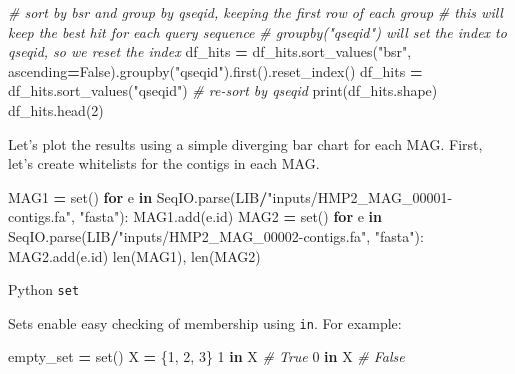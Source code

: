 \documentclass[
]{book}
\newenvironment{Shaded}{\begin{snugshade}}{\end{snugshade}}
\newcommand{\BuiltInTok}[1]{#1}
\newcommand{\CommentTok}[1]{\textcolor[rgb]{0.56,0.35,0.01}{\textit{#1}}}
\newcommand{\ControlFlowTok}[1]{\textcolor[rgb]{0.13,0.29,0.53}{\textbf{#1}}}
\newcommand{\DecValTok}[1]{\textcolor[rgb]{0.00,0.00,0.81}{#1}}
\newcommand{\KeywordTok}[1]{\textcolor[rgb]{0.13,0.29,0.53}{\textbf{#1}}}
\newcommand{\NormalTok}[1]{#1}
\newcommand{\OperatorTok}[1]{\textcolor[rgb]{0.81,0.36,0.00}{\textbf{#1}}}
\newcommand{\StringTok}[1]{\textcolor[rgb]{0.31,0.60,0.02}{#1}}
\newcommand{\VariableTok}[1]{\textcolor[rgb]{0.00,0.00,0.00}{#1}}
\begin{document}
\begin{Shaded}
\begin{Highlighting}[numbers=left,,]
\CommentTok{\# sort by bsr and group by qseqid, keeping the first row of each group}
\CommentTok{\# this will keep the best hit for each query sequence}
\CommentTok{\# groupby("qseqid") will set the index to qseqid, so we reset the index}
\NormalTok{df\_hits }\OperatorTok{=}\NormalTok{ df\_hits.sort\_values(}\StringTok{"bsr"}\NormalTok{, ascending}\OperatorTok{=}\VariableTok{False}\NormalTok{).groupby(}\StringTok{"qseqid"}\NormalTok{).first().reset\_index()}
\NormalTok{df\_hits }\OperatorTok{=}\NormalTok{ df\_hits.sort\_values(}\StringTok{"qseqid"}\NormalTok{) }\CommentTok{\# re{-}sort by qseqid}
\BuiltInTok{print}\NormalTok{(df\_hits.shape)}
\NormalTok{df\_hits.head(}\DecValTok{2}\NormalTok{)}
\end{Highlighting}
\end{Shaded}

Let's plot the results using a simple diverging bar chart for each MAG. First, let's create whitelists for the contigs in each MAG.

\begin{Shaded}
\begin{Highlighting}[numbers=left,,]
\NormalTok{MAG1 }\OperatorTok{=} \BuiltInTok{set}\NormalTok{()}
\ControlFlowTok{for}\NormalTok{ e }\KeywordTok{in}\NormalTok{ SeqIO.parse(LIB}\OperatorTok{/}\StringTok{"inputs/HMP2\_MAG\_00001{-}contigs.fa"}\NormalTok{, }\StringTok{"fasta"}\NormalTok{):}
\NormalTok{    MAG1.add(e.}\BuiltInTok{id}\NormalTok{)}
\NormalTok{MAG2 }\OperatorTok{=} \BuiltInTok{set}\NormalTok{()}
\ControlFlowTok{for}\NormalTok{ e }\KeywordTok{in}\NormalTok{ SeqIO.parse(LIB}\OperatorTok{/}\StringTok{"inputs/HMP2\_MAG\_00002{-}contigs.fa"}\NormalTok{, }\StringTok{"fasta"}\NormalTok{):}
\NormalTok{    MAG2.add(e.}\BuiltInTok{id}\NormalTok{)}
\BuiltInTok{len}\NormalTok{(MAG1), }\BuiltInTok{len}\NormalTok{(MAG2)}
\end{Highlighting}
\end{Shaded}

Python \texttt{set}

Sets enable easy checking of membership using \texttt{in}. For example:

\begin{Shaded}
\begin{Highlighting}[numbers=left,,]
\NormalTok{empty\_set }\OperatorTok{=} \BuiltInTok{set}\NormalTok{()}
\NormalTok{X }\OperatorTok{=}\NormalTok{ \{}\DecValTok{1}\NormalTok{, }\DecValTok{2}\NormalTok{, }\DecValTok{3}\NormalTok{\}}
\DecValTok{1} \KeywordTok{in}\NormalTok{ X }\CommentTok{\# True}
\DecValTok{0} \KeywordTok{in}\NormalTok{ X }\CommentTok{\# False}
\end{Highlighting}
\end{Shaded}
\end{document}
